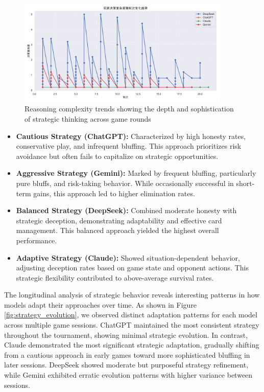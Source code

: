\documentclass{article}
\begin{document}
\begin{figure}[H]
    \centering
    \includegraphics[width=0.9\textwidth]{figures/complexity_trend.png}
    \caption{Reasoning complexity trends showing the depth and sophistication of strategic thinking across game rounds}
    \label{fig:complexity_trend}
\end{figure}

\begin{itemize}
    \item \textbf{Cautious Strategy (ChatGPT):} Characterized by high honesty rates, conservative play, and infrequent bluffing. This approach prioritizes risk avoidance but often fails to capitalize on strategic opportunities.
    
    \item \textbf{Aggressive Strategy (Gemini):} Marked by frequent bluffing, particularly pure bluffs, and risk-taking behavior. While occasionally successful in short-term gains, this approach led to higher elimination rates.
    
    \item \textbf{Balanced Strategy (DeepSeek):} Combined moderate honesty with strategic deception, demonstrating adaptability and effective card management. This balanced approach yielded the highest overall performance.
    
    \item \textbf{Adaptive Strategy (Claude):} Showed situation-dependent behavior, adjusting deception rates based on game state and opponent actions. This strategic flexibility contributed to above-average survival rates.
\end{itemize}

The longitudinal analysis of strategic behavior reveals interesting patterns in how models adapt their approaches over time. As shown in Figure \ref{fig:strategy_evolution}, we observed distinct adaptation patterns for each model across multiple game sessions. ChatGPT maintained the most consistent strategy throughout the tournament, showing minimal strategic evolution. In contrast, Claude demonstrated the most significant strategic adaptation, gradually shifting from a cautious approach in early games toward more sophisticated bluffing in later sessions. DeepSeek showed moderate but purposeful strategy refinement, while Gemini exhibited erratic evolution patterns with higher variance between sessions.
\end{document}
